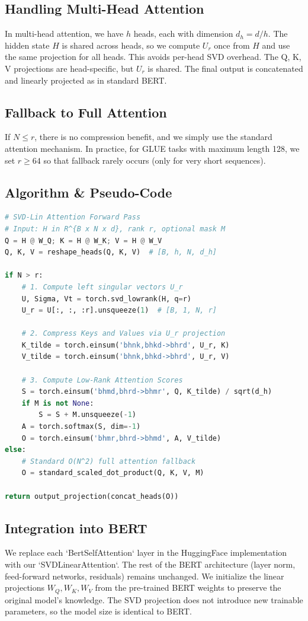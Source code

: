 \subsection{Handling Multi-Head Attention}
In multi-head attention, we have $h$ heads, each with dimension $d_h = d / h$. The hidden state $H$ is shared across heads, so we compute $U_r$ once from $H$ and use the same projection for all heads. This avoids per-head SVD overhead. The Q, K, V projections are head-specific, but $U_r$ is shared. The final output is concatenated and linearly projected as in standard BERT.

\subsection{Fallback to Full Attention}
If $N \le r$, there is no compression benefit, and we simply use the standard attention mechanism. In practice, for GLUE tasks with maximum length 128, we set $r \ge 64$ so that fallback rarely occurs (only for very short sequences).

\subsection{Algorithm \& Pseudo-Code}
\begin{lstlisting}[language=Python, caption={SVD-Lin Attention Forward Pass}]
# SVD-Lin Attention Forward Pass
# Input: H in R^{B x N x d}, rank r, optional mask M
Q = H @ W_Q; K = H @ W_K; V = H @ W_V
Q, K, V = reshape_heads(Q, K, V)  # [B, h, N, d_h]

if N > r:
    # 1. Compute left singular vectors U_r
    U, Sigma, Vt = torch.svd_lowrank(H, q=r)
    U_r = U[:, :, :r].unsqueeze(1)  # [B, 1, N, r]

    # 2. Compress Keys and Values via U_r projection
    K_tilde = torch.einsum('bhnk,bhkd->bhrd', U_r, K)
    V_tilde = torch.einsum('bhnk,bhkd->bhrd', U_r, V)

    # 3. Compute Low-Rank Attention Scores
    S = torch.einsum('bhmd,bhrd->bhmr', Q, K_tilde) / sqrt(d_h)
    if M is not None:
        S = S + M.unsqueeze(-1)
    A = torch.softmax(S, dim=-1)
    O = torch.einsum('bhmr,bhrd->bhmd', A, V_tilde)
else:
    # Standard O(N^2) full attention fallback
    O = standard_scaled_dot_product(Q, K, V, M)

return output_projection(concat_heads(O))
\end{lstlisting}

\subsection{Integration into BERT}
We replace each `BertSelfAttention` layer in the HuggingFace implementation with our `SVDLinearAttention`. The rest of the BERT architecture (layer norm, feed-forward networks, residuals) remains unchanged. We initialize the linear projections $W_Q, W_K, W_V$ from the pre-trained BERT weights to preserve the original model's knowledge. The SVD projection does not introduce new trainable parameters, so the model size is identical to BERT.

